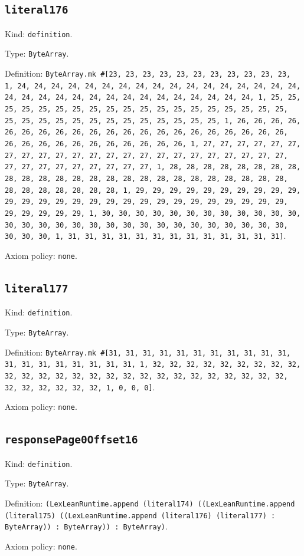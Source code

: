 \documentclass[11pt]{article}
\begin{document}
\subsection*{\texttt{literal176}}
\noindent Kind: \texttt{definition}.\par
\noindent Type: \texttt{ByteArray}.\par
\noindent Definition: \texttt{ByteArray.mk \#[23, 23, 23, 23, 23, 23, 23, 23, 23, 23, 23, 1, 24, 24, 24, 24, 24, 24, 24, 24, 24, 24, 24, 24, 24, 24, 24, 24, 24, 24, 24, 24, 24, 24, 24, 24, 24, 24, 24, 24, 24, 24, 24, 24, 1, 25, 25, 25, 25, 25, 25, 25, 25, 25, 25, 25, 25, 25, 25, 25, 25, 25, 25, 25, 25, 25, 25, 25, 25, 25, 25, 25, 25, 25, 25, 25, 25, 1, 26, 26, 26, 26, 26, 26, 26, 26, 26, 26, 26, 26, 26, 26, 26, 26, 26, 26, 26, 26, 26, 26, 26, 26, 26, 26, 26, 26, 26, 26, 26, 26, 1, 27, 27, 27, 27, 27, 27, 27, 27, 27, 27, 27, 27, 27, 27, 27, 27, 27, 27, 27, 27, 27, 27, 27, 27, 27, 27, 27, 27, 27, 27, 27, 27, 1, 28, 28, 28, 28, 28, 28, 28, 28, 28, 28, 28, 28, 28, 28, 28, 28, 28, 28, 28, 28, 28, 28, 28, 28, 28, 28, 28, 28, 28, 28, 28, 28, 1, 29, 29, 29, 29, 29, 29, 29, 29, 29, 29, 29, 29, 29, 29, 29, 29, 29, 29, 29, 29, 29, 29, 29, 29, 29, 29, 29, 29, 29, 29, 29, 29, 1, 30, 30, 30, 30, 30, 30, 30, 30, 30, 30, 30, 30, 30, 30, 30, 30, 30, 30, 30, 30, 30, 30, 30, 30, 30, 30, 30, 30, 30, 30, 30, 30, 1, 31, 31, 31, 31, 31, 31, 31, 31, 31, 31, 31, 31, 31]}.\par
\noindent Axiom policy: \texttt{none}.\par
\subsection*{\texttt{literal177}}
\noindent Kind: \texttt{definition}.\par
\noindent Type: \texttt{ByteArray}.\par
\noindent Definition: \texttt{ByteArray.mk \#[31, 31, 31, 31, 31, 31, 31, 31, 31, 31, 31, 31, 31, 31, 31, 31, 31, 31, 31, 1, 32, 32, 32, 32, 32, 32, 32, 32, 32, 32, 32, 32, 32, 32, 32, 32, 32, 32, 32, 32, 32, 32, 32, 32, 32, 32, 32, 32, 32, 32, 32, 32, 1, 0, 0, 0]}.\par
\noindent Axiom policy: \texttt{none}.\par
\subsection*{\texttt{responsePage0Offset16}}
\noindent Kind: \texttt{definition}.\par
\noindent Type: \texttt{ByteArray}.\par
\noindent Definition: \texttt{(LexLeanRuntime.append (literal174) ((LexLeanRuntime.append (literal175) ((LexLeanRuntime.append (literal176) (literal177) : ByteArray)) : ByteArray)) : ByteArray)}.\par
\noindent Axiom policy: \texttt{none}.\par
\end{document}
